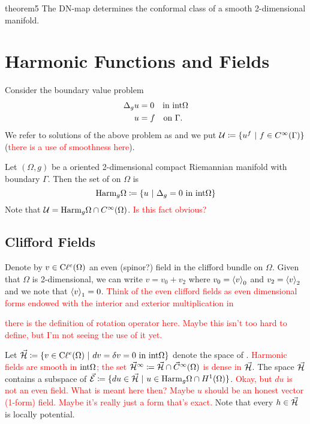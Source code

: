 \begin{thm}{}{theorem5}
	The DN-map determines the conformal class of  a smooth 2-dimensional manifold.
\end{thm}

\section{Harmonic Functions and Fields}
Consider the boundary value problem
\begin{align}
	\Delta_g u &= 0 \quad \textrm{in $\mathrm{int} \Omega$}\\
	u&=f \quad \textrm{on $\Gamma$}.
\end{align}
We refer to solutions of the above problem as  and we put $\mathcal{U} \coloneqq \{u^f~\vert~f\in C^\infty(\Gamma)\}$ (\textcolor{red}{there is a use of smoothness here}).

Let $(\Omega,g)$ be a oriented 2-dimensional compact Riemannian manifold with boundary $\Gamma$. Then the set of  on $\Omega$ is
  \[
  \mathrm{Harm}_g \Omega \coloneqq \{u~\vert~\Delta_g=0 ~\textrm{in}~\mathrm{int} \Omega\}
  \]
  Note that $\mathcal{U} = \mathrm{Harm}_g \Omega \cap C^\infty (\Omega)$. \textcolor{red}{Is this fact obvious?}
    
  \subsection{Clifford Fields}
  Denote by $v\in \mathrm{C}\ell^e(\Omega)$ an even (spinor?) field in the clifford bundle on $\Omega$.  Given that $\Omega$ is 2-dimensional, we can write $v=v_0+v_2$ where $v_0=\left\langle v\right\rangle_0$ and $v_2=\left\langle v\right\rangle_2$ and we note that $\left\langle v\right\rangle_1=0$. \textcolor{red}{Think of the even clifford fields as even dimensional forms endowed with the interior and exterior multiplication in \cite{dirac-spectral}}
    
  \textcolor{red}{there is the definition of rotation operator here. Maybe this isn't too hard to define, but I'm not seeing the use of it yet.}
  
  Let $\vec{\mathcal{H}}\coloneqq \{v \in \mathrm{C}\ell^e(\Omega) ~\vert~ dv=\delta v = 0 ~\textrm{in $\mathrm{int} \Omega$}\}$ denote the space of .  \textcolor{red}{Harmonic fields are smooth in $\mathrm{int} \Omega$; the set $\vec{\mathcal{H}}^\infty \coloneqq \vec{\mathcal{H}} \cap \vec{C}^\infty(\Omega)$ is dense in $\vec{\mathcal{H}}$}. The space $\vec{\mathcal{H}}$ contains a subspace of  $\vec{\mathcal{E}} \coloneqq \{d u \in \vec{\mathcal{H}} ~\vert~ u \in \mathrm{Harm}_g\Omega \cap H^1(\Omega)\}$.  \textcolor{red}{Okay, but $d u$ is not an even field.  What is meant here then? Maybe $u$ should be an honest vector (1-form) field. Maybe it's really just a form that's exact.} Note that every $h\in \vec{\mathcal{H}}$ is locally potential.
  
